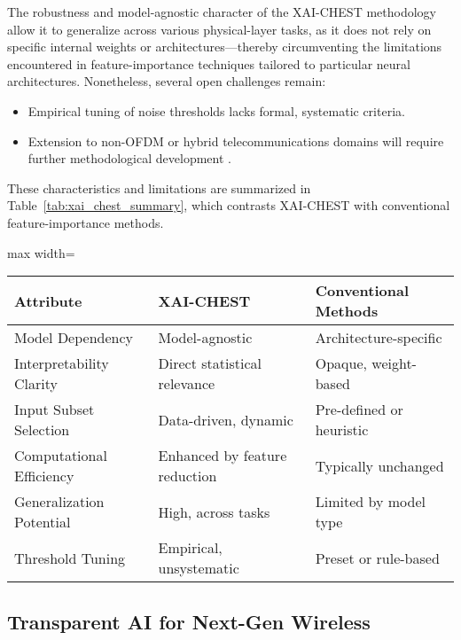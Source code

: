 \documentclass[sigconf]{acmart}
\begin{document}
The robustness and model-agnostic character of the XAI-CHEST methodology allow it to generalize across various physical-layer tasks, as it does not rely on specific internal weights or architectures—thereby circumventing the limitations encountered in feature-importance techniques tailored to particular neural architectures. Nonetheless, several open challenges remain:

\begin{itemize}
    \item Empirical tuning of noise thresholds lacks formal, systematic criteria.
    \item Extension to non-OFDM or hybrid telecommunications domains will require further methodological development \cite{ref38}.
\end{itemize}

These characteristics and limitations are summarized in Table~\ref{tab:xai_chest_summary}, which contrasts XAI-CHEST with conventional feature-importance methods.

\begin{table*}[htbp]
\centering
\caption{Comparison of XAI-CHEST and Conventional Feature-Importance Methods}
\label{tab:xai_chest_summary}
\begin{adjustbox}{max width=\textwidth}
\begin{tabular}{lll}
\toprule
\textbf{Attribute} & \textbf{XAI-CHEST} & \textbf{Conventional Methods} \\
\midrule
Model Dependency & Model-agnostic & Architecture-specific \\
Interpretability Clarity & Direct statistical relevance & Opaque, weight-based \\
Input Subset Selection & Data-driven, dynamic & Pre-defined or heuristic \\
Computational Efficiency & Enhanced by feature reduction & Typically unchanged \\
Generalization Potential & High, across tasks & Limited by model type \\
Threshold Tuning & Empirical, unsystematic & Preset or rule-based \\
\bottomrule
\end{tabular}
\end{adjustbox}
\end{table*}

\subsection{Transparent AI for Next-Gen Wireless}
\end{document}

